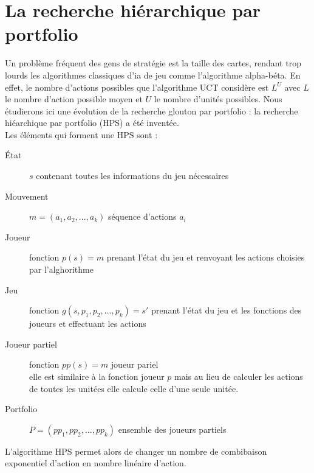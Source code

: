 \documentclass[a4paper, 11pt]{article}
\theoremstyle{definition}
\begin{document}
\section{La recherche hiérarchique par portfolio}
Un problème fréquent des gens de stratégie est la taille des cartes, rendant trop
lourds les algorithmes classiques d'ia de jeu comme l'algorithme alpha-béta. 
En effet, le nombre d'actions possibles que l'algorithme UCT considère est $L^U$
avec $L$ le nombre d'action possible moyen et $U$ le nombre d'unités possibles.
Nous étudierons ici une évolution de la recherche glouton par portfolio : la
recherche hiéarchique par portfolio (HPS) a été inventée.\\
Les éléments qui forment une HPS sont :
\begin{description}
    \item[État] $s$ contenant toutes les informations du jeu nécessaires
    \item[Mouvement] $m= ( a_1, a_2, ..., a_k )$ séquence d'actions $a_i$
    \item[Joueur] fonction $p(s) = m$ prenant l'état du jeu et renvoyant les 
    actions choisies par l'alghorithme
    \item[Jeu] fonction $g(s, p_1, p_2, ..., p_k) = s'$ prenant l'état du jeu et
    les fonctions des joueurs et effectuant les actions
    \item[Joueur partiel] fonction $pp(s) = m$ joueur pariel \\
    elle est similaire à la fonction joueur $p$ mais au lieu de calculer les actions
    de toutes les unitées elle calcule celle d'une seule unitée.
    \item[Portfolio] $P = (pp_1, pp_2, ..., pp_k)$ ensemble des joueurs partiels
\end{description}
L'algorithme HPS permet alors de changer un nombre de combibaison exponentiel
d'action en nombre linéaire d'action.
\end{document}
